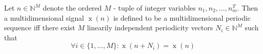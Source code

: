 Let $n \in \mathbb{N}^{M}$ denote the ordered $M$ - tuple of integer variables $n_{1}, n_{2}, \dots, n_{m}^{T}$. Then a multidimensional signal $\operatorname{x}(n)$ is defined to be a multidimensional periodic sequence iff there exist $M$ linearily independent periodicity vectors $N_i \in \mathbb{N}^{M}$ such that
$$\forall i \in \{1, \dots, M\} : \operatorname{x}(n + N_i) = \operatorname{x}(n)$$
